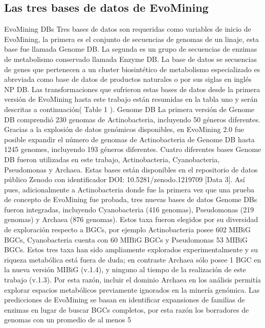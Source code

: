 \documentclass[12pt,twoside]{reedthesis}
\begin{document}
  \subsection{Las tres bases de datos de
  EvoMining}\label{las-tres-bases-de-datos-de-evomining}
  
  EvoMining DBs Tres bases de datos son requeridas como variables de
  inicio de EvoMining, la primera es el conjunto de secuencias de genomas
  de un linaje, esta base fue llamada Genome DB. La segunda es un grupo de
  secuencias de enzimas de metabolismo conservado llamada Enzyme DB. La
  base de datos se secuencias de genes que pertenecen a un cluster
  biosintético de metabolismo especializado es abreviada como base de
  datos de productos naturales o por sus siglas en inglés NP DB. Las
  transformaciones que sufrieron estas bases de datos desde la primera
  versión de EvoMining hasta este trabajo están resumidas en la tabla uno
  y serán descritas a continuación( Table 1 ). Genome DB La primera
  versión de Genome DB comprendió 230 genomas de Actinobacteria,
  incluyendo 50 géneros diferentes. Gracias a la explosión de datos
  genómicos disponibles, en EvoMining 2.0 fue posible expandir el número
  de genomas de Actinobacteria de Genome DB hasta 1245 genomes, incluyendo
  193 géneros diferentes. Cuatro diferentes bases Genome DB fueron
  utilizadas en este trabajo, Actinobacteria, Cyanobacteria, Pseudomonas y
  Archaea. Estas bases están disponibles en el repositorio de datos
  público Zenodo con identificador DOI: 10.5281/zenodo.1219709 {[}Data
  3{]}. Así pues, adicionalmente a Actinobacteria donde fue la primera vez
  que una prueba de concepto de EvoMining fue probada, tres nuevas bases
  de datos Genome DBs fueron integradas, incluyendo Cyanobacteria (416
  genomas), Pseudomonas (219 genomas) y Archaea (876 genomas). Estos taxa
  fueron elegidos por su diversidad de exploración respecto a BGCs, por
  ejemplo Actinobacteria posee 602 MIBiG BGCs, Cyanobacteria cuenta con 60
  MIBiG BGCs y Pseudomonas 53 MIBiG BGCs. Estos tres taxa han sido
  ampliamente explorados experimentalmente y su riqueza metabólica está
  fuera de duda; en contraste Archaea sólo posee 1 BGC en la nueva versión
  MIBiG (v.1.4), y ninguno al tiempo de la realización de este trabajo
  (v.1.3). Por esta razón, incluir el dominio Archaea en los análisis
  permitía explorar espacios metabólicos previamente ignorados en la
  minería genómica. Las predicciones de EvoMining se basan en identificar
  expansiones de familias de enzimas en lugar de buscar BGCs completos,
  por esta razón los borradores de genomas con un promedio de al menos 5
\end{document}
